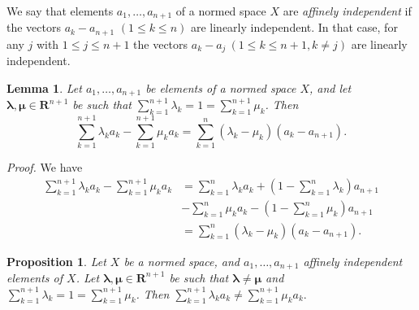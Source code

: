 \documentclass[11pt]{article}%
\newtheorem{lemma}[theorem]{Lemma}
\newtheorem{proposition}[theorem]{Proposition}
\newenvironment{proof}[1][Proof]{\noindent\textit{#1.} }{}
\begin{document}
We say that elements $a_{1},\ldots,a_{n+1}$ of a normed space $X$ are
\emph{affinely independent} if the vectors $a_{k}-a_{n+1}$ $\left(  1\leq
k\leq n\right)  $ are linearly independent. In that case, for any $j$ with
$1\leq j\leq n+1$ the vectors $a_{k}-a_{j}\ \left(  1\leq k\leq n+1,k\neq
j\right)  $ are linearly independent.

\begin{lemma}
\label{sept03L1}Let $a_{1},\ldots,a_{n+1}$ be elements of a normed space $X$,
and let $\mathbf{\lambda},\mathbf{\mu\in}\mathbf{R}^{n+1}$ be such that $%
{\textstyle\sum_{k=1}^{n+1}}
\lambda_{k}=1=%
{\textstyle\sum_{k=1}^{n+1}}
\mu_{k}$. Then%
\[%
{\textstyle\sum_{k=1}^{n+1}}
\lambda_{k}a_{k}-%
{\textstyle\sum_{k=1}^{n+1}}
\mu_{k}a_{k}=%
{\textstyle\sum_{k=1}^{n}}
\left(  \lambda_{k}-\mu_{k}\right)  (a_{k}-a_{n+1}).
\]

\end{lemma}

\begin{proof}
We have%
\begin{align}%
{\textstyle\sum_{k=1}^{n+1}}
\lambda_{k}a_{k}-%
{\textstyle\sum_{k=1}^{n+1}}
\mu_{k}a_{k}  &  =%
{\textstyle\sum_{k=1}^{n}}
\lambda_{k}a_{k}+\left(  1-%
{\textstyle\sum_{k=1}^{n}}
\lambda_{k}\right)  a_{n+1}\nonumber\\
&  -%
{\textstyle\sum_{k=1}^{n}}
\mu_{k}a_{k}-\left(  1-%
{\textstyle\sum_{k=1}^{n}}
\mu_{k}\right)  a_{n+1}\nonumber\\
&  =%
{\textstyle\sum_{k=1}^{n}}
\left(  \lambda_{k}-\mu_{k}\right)  (a_{k}-a_{n+1}). \tag*{$\square$}%
\end{align}

\end{proof}

\begin{proposition}
\label{jul23p1}Let $X$ be a normed space, and $a_{1},\ldots,a_{n+1}$ affinely
independent elements of $X$. Let $\mathbf{\lambda},\mathbf{\mu\in}%
\mathbf{R}^{n+1}$ be such that $\mathbf{\lambda}\neq\mathbf{\mu}$ and $%
{\textstyle\sum_{k=1}^{n+1}}
\lambda_{k}=1=%
{\textstyle\sum_{k=1}^{n+1}}
\mu_{k}$. Then $%
{\textstyle\sum_{k=1}^{n+1}}
\lambda_{k}a_{k}\neq%
{\textstyle\sum_{k=1}^{n+1}}
\mu_{k}a_{k}.$
\end{proposition}
\end{document}
